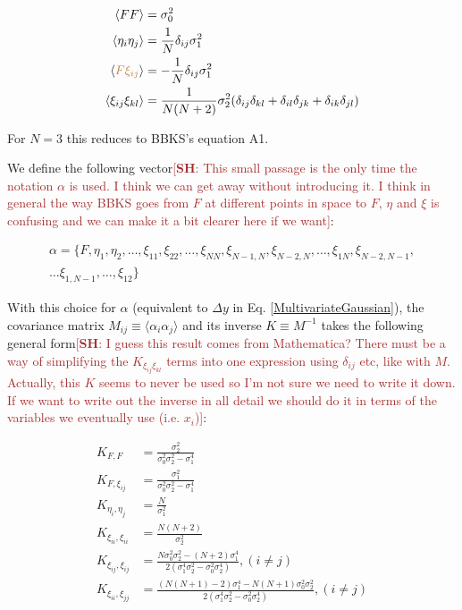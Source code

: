 \documentclass[12pt]{article}
\newcommand{\SH}[1]{\textcolor{brown}{[{\bf SH}: #1]}}
\newcommand{\sh}[1]{\textcolor{brown}{#1}}
\begin{document}
\begin{equation} \label{corr}
\begin{split}
\langle FF \rangle &= \sigma_0^2 \\
\langle\eta_i\eta_j\rangle &= \frac{1}{N}\delta_{ij}\sigma_1^2 \\
\langle\sh{F\xi_{ij}}\rangle &= -\frac{1}{N}\delta_{ij}\sigma_1^2 \\
\langle\xi_{ij}\xi_{kl}\rangle &= \frac{1}{N(N+2)}\sigma_2^2(\delta_{ij}\delta_{kl}+\delta_{il}\delta_{jk}+\delta_{ik}\delta_{jl})
\end{split}
\end{equation}

\noindent For $N=3$ this reduces to BBKS's equation A1. 

We define the following vector\SH{This small passage is the only time the notation $\alpha$ is used. I think we can get away without introducing it. I think in general the way BBKS goes from $F$ at different points in space to $F$, $\eta$ and $\xi$ is confusing and we can make it a bit clearer here if we want}:

\begin{equation}
\begin{split}
\alpha = \{F,\eta_1,\eta_2,\ldots,\xi_{11},\xi_{22},\ldots,\xi_{NN},\xi_{N-1,N},\xi_{N-2,N},\ldots,\xi_{1N},\xi_{N-2,N-1},\\
\ldots\xi_{1,N-1},\ldots,\xi_{12}\}
\end{split}
\end{equation}

\noindent With this choice for $\alpha$ (equivalent to $\Delta y$ in Eq. \ref{MultivariateGaussian}), the covariance matrix $M_{ij}\equiv\langle\alpha_i\alpha_j\rangle$ and its inverse $K \equiv M^{-1}$ takes the following general form\SH{I guess this result comes from Mathematica? There must be a way of simplifying the $K_{\xi_{ij}\xi_{kl}}$ terms into one expression using $\delta_{ij}$ etc, like with $M$. Actually, this $K$ seems to never be used so I'm not sure we need to write it down. If we want to write out the inverse in all detail we should do it in terms of the variables we eventually use (i.e. $x_i$)}:

\begin{align*}
K_{F, F} &= \frac{\sigma_2^2}{\sigma_0^2\sigma_2^2-\sigma_1^4} \\
K_{F, \xi_{ij}} &= \frac{\sigma_1^2}{\sigma_0^2\sigma_2^2-\sigma_1^4} \\
K_{\eta_i,\eta_j} &= \frac{N}{\sigma_1^2}\\
K_{\xi_{ii},\xi_{ii}} &=  \frac{N(N+2)}{\sigma_2^2} \\
K_{\xi_{ij}, \xi_{ij}} &= \frac{N\sigma_0^2\sigma_2^2-(N+2)\sigma_1^4}{2(\sigma_1^4\sigma_2^2-\sigma_0^2\sigma_2^4)}, (i\neq j)\\
K_{\xi_{ii}, \xi_{jj}} &= \frac{(N(N+1)-2)\sigma_1^4 - N(N+1)\sigma_0^2\sigma_2^2}{2(\sigma_1^4\sigma_2^2-\sigma_0^2\sigma_2^4)}, (i \neq j)\\
\end{align*}
\end{document}
